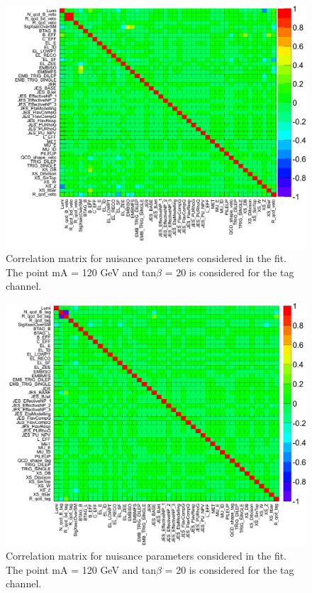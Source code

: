 \begin{figure}[htp]
     \begin{center}

           \includegraphics[width=\textwidth]{figure/np_check/matrix_veto.png}
    \end{center}
    \caption{ Correlation matrix for nuisance parameters considered in the fit. The point mA = 120 GeV and tan$\beta$ = 20 is considered for the tag channel.} 
    \label{fig:np_correlation_veto}
\end{figure}
\begin{figure}[htp]
     \begin{center}

           \includegraphics[width=\textwidth]{figure/np_check/matrix_tag.png}
    \end{center}
    \caption{ Correlation matrix for nuisance parameters considered in the fit. The point mA = 120 GeV and tan$\beta$ = 20 is considered for the tag channel.} 
    \label{fig:np_correlation_tag}
\end{figure}


